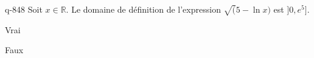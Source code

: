 \begin{truefalse}{q-848}
Soit $x\in \mathbb R$. Le domaine de définition de l'expression $\sqrt(5-\ln x)$ est $]0,e^5]$.
\item* Vrai
\item Faux
\end{truefalse}

